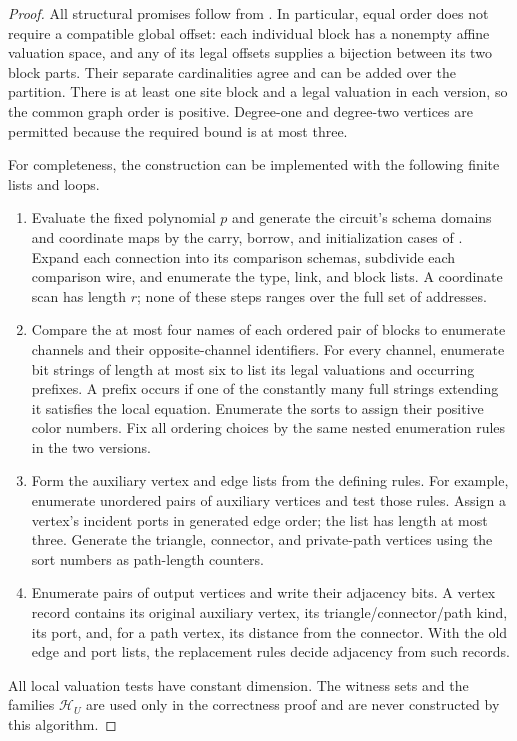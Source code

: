 \documentclass[11pt]{article}
\theoremstyle{definition}
\begin{document}
\begin{proof}
All structural promises follow from .
In particular, equal order does not require a compatible global offset:
each individual block has a nonempty affine valuation space, and any of
its legal offsets supplies a bijection between its two block parts.
Their separate cardinalities agree and can be added over the partition.
There is at least one site block and a legal valuation in each version,
so the common graph order is positive.  Degree-one and degree-two vertices
are permitted because the required bound is at most three.

For completeness, the construction can be implemented with the following
finite lists and loops.
\begin{enumerate}
\item Evaluate the fixed polynomial $p$ and generate the circuit's schema
      domains and coordinate maps by the carry, borrow, and initialization
      cases of .  Expand each connection into
      its comparison schemas, subdivide each comparison wire, and
      enumerate the type, link, and block lists.  A coordinate scan has
      length $r$; none of these steps ranges over the full set of
      addresses.
\item Compare the at most four names of each ordered pair of blocks to
      enumerate channels and their opposite-channel identifiers.  For
      every channel, enumerate bit strings of length at most six to list
      its legal valuations and occurring prefixes.  A prefix occurs if
      one of the constantly many full strings extending it satisfies the
      local equation.  Enumerate the sorts to assign their positive
      color numbers.  Fix all ordering choices by the same nested
      enumeration rules in the two versions.
\item Form the auxiliary vertex and edge lists from the defining rules.
      For example, enumerate unordered pairs of auxiliary vertices and
      test those rules.  Assign a vertex's incident ports in generated
      edge order; the list has length at most three.  Generate the
      triangle, connector, and private-path vertices using the sort
      numbers as path-length counters.
\item Enumerate pairs of output vertices and write their adjacency bits.
      A vertex record contains its original auxiliary vertex, its
      triangle/connector/path kind, its port, and, for a path vertex,
      its distance from the connector.  With the old edge and port lists,
      the replacement rules decide adjacency from such records.
\end{enumerate}
All local valuation tests have constant dimension.  The witness sets and
the families $\mathcal H_U$ are used only in the correctness proof and are never
constructed by this algorithm.


\end{proof}
\end{document}
